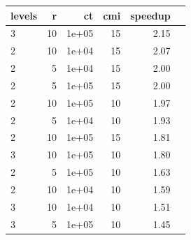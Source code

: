 \begin{tabular}{l|rrrrr}
\hline
levels & r & ct & cmi & speedup \\
\hline
3 & 10 & 1e+05 & 15 & 2.15 \\
2 & 10 & 1e+04 & 15 & 2.07 \\
2 & 5 & 1e+04 & 15 & 2.00 \\
2 & 5 & 1e+05 & 15 & 2.00 \\
2 & 10 & 1e+05 & 10 & 1.97 \\
2 & 5 & 1e+04 & 10 & 1.93 \\
2 & 10 & 1e+05 & 15 & 1.81 \\
3 & 10 & 1e+05 & 10 & 1.80 \\
2 & 5 & 1e+05 & 10 & 1.63 \\
2 & 10 & 1e+04 & 10 & 1.59 \\
3 & 10 & 1e+04 & 10 & 1.51 \\
3 & 5 & 1e+05 & 10 & 1.45 \\
\hline
\end{tabular}
